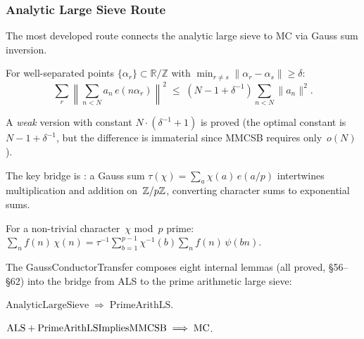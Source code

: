 \subsubsection*{Analytic Large Sieve Route}

The most developed route connects the analytic large sieve to MC via
Gauss sum inversion.

\begin{property}
For well-separated points $\{\alpha_r\} \subset \mathbb{R}/\mathbb{Z}$
with $\min_{r \neq s} \|\alpha_r - \alpha_s\| \geq \delta$:
\[
\sum_r \left\|\sum_{n < N} a_n\, e(n\alpha_r)\right\|^2
\;\leq\; (N - 1 + \delta^{-1}) \sum_{n < N} \|a_n\|^2.
\]
\end{property}

\begin{theorem}
\label{thm:weak-als}
A \emph{weak} version with constant $N \cdot (\delta^{-1} + 1)$ is
proved (the optimal constant is $N - 1 + \delta^{-1}$, but the
difference is immaterial since MMCSB requires only~$o(N)$).
\end{theorem}

The key bridge is : a Gauss sum
$\tau(\chi) = \sum_{a} \chi(a)\, e(a/p)$ intertwines multiplication
and addition on~$\mathbb{Z}/p\mathbb{Z}$, converting character sums to exponential
sums.

\begin{theorem}
\label{thm:gauss-inversion}
For a non-trivial character~$\chi$ mod~$p$ prime:
$\sum_n f(n)\, \chi(n)
= \tau^{-1} \sum_{b=1}^{p-1} \chi^{-1}(b) \sum_n f(n)\, \psi(bn)$.
\end{theorem}

The GaussConductorTransfer composes eight internal lemmas (all proved,
\S56--\S62) into the bridge from ALS to the prime arithmetic large sieve:

\begin{theorem}
\label{thm:als-prime}
$\mathrm{AnalyticLargeSieve} \;\Longrightarrow\; \mathrm{PrimeArithLS}$.
\end{theorem}

\begin{theorem}
$\mathrm{ALS} + \mathrm{PrimeArithLSImpliesMMCSB} \;\Longrightarrow\; \mathrm{MC}$.
\end{theorem}

